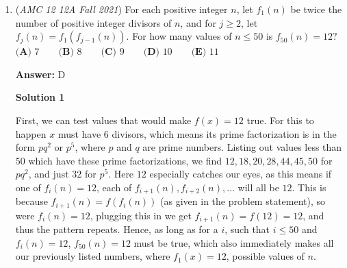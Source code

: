 \begin{enumerate}
 \textbf{Easy Solution with Intermediate Value Theorem} We know that $x^2-x=180-2x+360k$ or $x^2-x=360k$ from looking at the $\text{sin}$ values on the unit circle. With these equations, we can just insert the values that are given in the $5$ answers. 

 
Let's try $\text{A}$ first. 

 We know that one of the equations should be greater on the left, and another equation we make should be greater on the right for the solution to be in between the values inserted into the equations. The two numbers it is in between is $9$ and $10$ since it is rounded up. 

 
$100-10$ vs $180-20,$
$81-9$ vs $180-18.$

 
This does not satisfy what we would like to find.

 
Now let's try $\text{B}$.

 Between $12$ and $13$;

 
$144-12$ vs $180-24,$
$169-13$ vs $180-26.$

 
Now this satisfies our hunt for the solution.The answer is $\boxed{\text{(B)}}$

 emilyyunhanq@gmail.com

 Solution by Emily Q

 
(edited by A7456321)

 Solved both Mentally and by writing things down

 


	\item (\textit{AMC 12 12A Fall 2021}) For each positive integer $n$, let $f_1(n)$ be twice the number of positive integer divisors of $n$, and for $j \ge 2$, let $f_j(n) = f_1(f_{j-1}(n))$. For how many values of $n \le 50$ is $f_{50}(n) = 12?$
$\textbf{(A) }7\qquad\textbf{(B) }8\qquad\textbf{(C) }9\qquad\textbf{(D) }10\qquad\textbf{(E) }11$

 \textbf{Answer: }D



\textbf{Solution 1}

First, we can test values that would make $f(x)=12$ true. For this to happen $x$ must have $6$ divisors, which means its prime factorization is in the form $pq^2$ or $p^5$, where $p$ and $q$ are prime numbers. Listing out values less than $50$ which have these prime factorizations, we find $12,18,20,28,44,45,50$ for $pq^2$, and just $32$ for $p^5$. Here $12$ especially catches our eyes, as this means if one of $f_i(n)=12$, each of $f_{i+1}(n), f_{i+2}(n), ...$ will all be $12$. This is because $f_{i+1}(n)=f(f_i(n))$ (as given in the problem statement), so were $f_i(n)=12$, plugging this in we get $f_{i+1}(n)=f(12)=12$, and thus the pattern repeats. Hence, as long as for a $i$, such that $i\leq 50$ and $f_{i}(n)=12$, $f_{50}(n)=12$ must be true, which also immediately makes all our previously listed numbers, where $f_1(x)=12$, possible values of $n$.


\end{enumerate}
